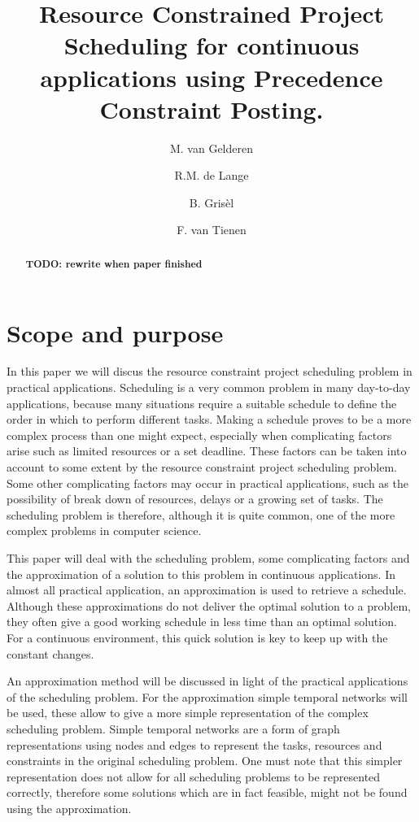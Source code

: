 \documentclass{article}
\title{Resource Constrained Project Scheduling for continuous applications using Precedence Constraint Posting.}
\author{M. van Gelderen  \and
    R.M. de Lange \and
    B. Gris\`el \and
    F. van Tienen}
\date{}
\theoremstyle{definition}
\newcommand{\TODO}[1]{{\color{red}\textbf{TODO: #1}}}
\begin{document}
\maketitle
\thispagestyle{empty}

\begin{abstract}
\TODO{rewrite when paper finished}
\end{abstract}


\newpage


\section{Scope and purpose}

In this paper we will discus the resource constraint project scheduling problem in practical applications.
Scheduling is a very common problem in many day-to-day applications, because many situations require a suitable schedule to define the order in which to perform different tasks.
Making a schedule proves to be a more complex process than one might expect, especially when complicating factors arise such as limited resources or a set deadline.
These factors can be taken into account to some extent by the resource constraint project scheduling problem.
Some other complicating factors may occur in practical applications, such as the possibility of break down of resources, delays or a growing set of tasks.
The scheduling problem is therefore, although it is quite common, one of the more complex problems in computer science.

This paper will deal with the scheduling problem, some complicating factors and the approximation of a solution to this problem in continuous applications.
In almost all practical application, an approximation is used to retrieve a schedule.
Although these approximations do not deliver the optimal solution to a problem, they often give a good working schedule in less time than an optimal solution.
For a continuous environment, this quick solution is key to keep up with the constant changes.

An approximation method will be discussed in light of the practical applications of the scheduling problem.
For the approximation simple temporal networks will be used, these allow to give a more simple representation of the complex scheduling problem.
Simple temporal networks are a form of graph representations using nodes and edges to represent the tasks, resources and constraints in the original scheduling problem.
One must note that this simpler representation does not allow for all scheduling problems to be represented correctly, therefore some solutions which are in fact feasible, might not be found using the approximation.
\end{document}
